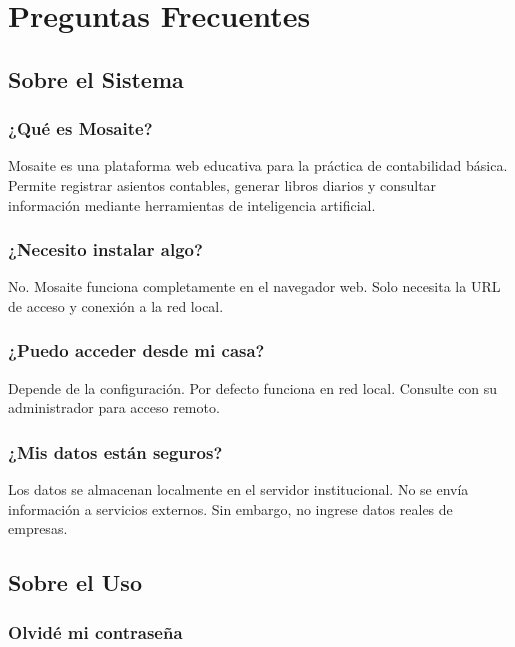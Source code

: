 \chapter{Preguntas Frecuentes}

\section{Sobre el Sistema}

\subsection{¿Qué es Mosaite?}

Mosaite es una plataforma web educativa para la práctica de contabilidad básica. Permite registrar asientos contables, generar libros diarios y consultar información mediante herramientas de inteligencia artificial.

\subsection{¿Necesito instalar algo?}

No. Mosaite funciona completamente en el navegador web. Solo necesita la URL de acceso y conexión a la red local.

\subsection{¿Puedo acceder desde mi casa?}

Depende de la configuración. Por defecto funciona en red local. Consulte con su administrador para acceso remoto.

\subsection{¿Mis datos están seguros?}

Los datos se almacenan localmente en el servidor institucional. No se envía información a servicios externos. Sin embargo, no ingrese datos reales de empresas.

\section{Sobre el Uso}

\subsection{Olvidé mi contraseña}

